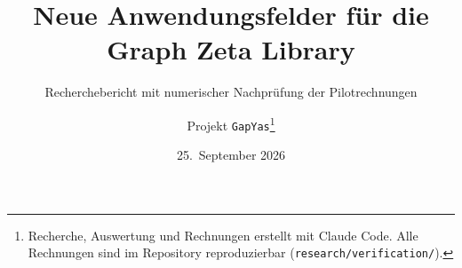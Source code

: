 \documentclass[11pt,a4paper,parskip=half,toc=sectionentrywithdots]{scrartcl}
\title{Neue Anwendungsfelder für die Graph Zeta Library}
\subtitle{Recherchebericht mit numerischer Nachprüfung der Pilotrechnungen}
\author{Projekt \texttt{GapYas}\thanks{Recherche, Auswertung und Rechnungen erstellt mit Claude Code. Alle Rechnungen sind im Repository reproduzierbar (\texttt{research/verification/}).}}
\date{25.~September 2026}
\begin{document}
\maketitle
\begin{abstract}
\noindent

\end{abstract}
\tableofcontents
\clearpage

\end{document}
